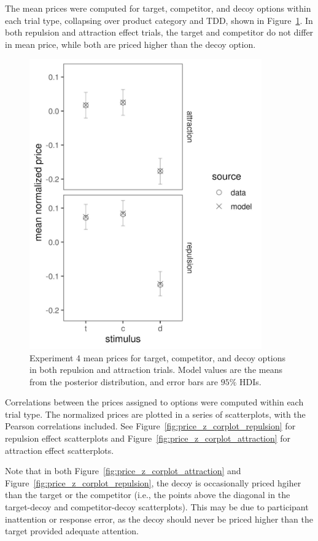 The mean prices were computed for target, competitor, and decoy options within each trial type, collapsing over product category and TDD, shown in Figure~\ref{fig:price_mu_model_data}. In both repulsion and attraction effect trials, the target and competitor do not differ in mean price, while both are priced higher than the decoy option.

\begin{figure}
    \includegraphics[scale=0.5, width=100mm]{figures/pricing_mu_model_data.jpeg}
    \caption{Experiment 4 mean prices for target, competitor, and decoy options in both repulsion and attraction trials. Model values are the means from the posterior distribution, and error bars are $95\%$ HDIs.}
    \label{fig:price_mu_model_data}
\end{figure}

Correlations between the prices assigned to options were computed within each trial type. The normalized prices are plotted in a series of scatterplots, with the Pearson correlations included. See Figure~\ref{fig:price_z_corplot_repulsion} for repulsion effect scatterplots and Figure~\ref{fig:price_z_corplot_attraction} for attraction effect scatterplots.

Note that in both Figure~\ref{fig:price_z_corplot_attraction} and Figure~\ref{fig:price_z_corplot_repulsion}, the decoy is occasionally priced hgiher than the target or the competitor (i.e., the points above the diagonal in the target-decoy and competitor-decoy scatterplots). This may be due to participant inattention or response error, as the decoy should never be priced higher than the target provided adequate attention. 

